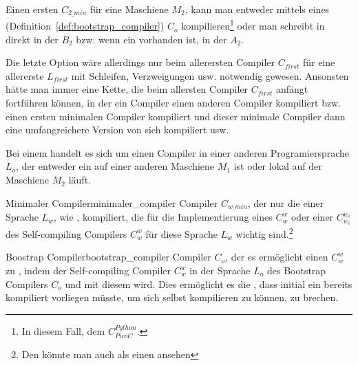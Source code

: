 \begin{Special_Paragraph}
  Einen ersten  $C_{2\_min}$ für eine Maschiene $M_2$, kann man entweder mittels eines   (Definition~\ref{def:bootstrap_compiler}) $C_o$ kompilieren\footnote{In diesem Fall, dem  $C_{PicoC}^{Python}$.} oder man schreibt in direkt in der  $B_2$ bzw. wenn ein  vorhanden ist, in der  $A_2$.

  Die letzte Option wäre allerdings nur beim allerersten Compiler $C_{first}$ für eine allererste  $L_{first}$ mit Schleifen, Verzweigungen usw. notwendig gewesen. Ansonsten hätte man immer eine Kette, die beim allersten Compiler $C_{first}$ anfängt fortführen können, in der ein Compiler einen anderen Compiler kompiliert bzw. einen ersten minimalen Compiler kompiliert und dieser minimale Compiler dann eine umfangreichere Version von sich kompiliert usw.

  Bei einem  handelt es sich um einen Compiler in einer anderen Programiersprache $L_o$, der entweder ein  auf einer anderen Maschiene $M_1$ ist oder lokal auf der Maschiene $M_2$ läuft.
\end{Special_Paragraph}

\begin{Definition}{Minimaler Compiler}{minimaler_compiler}
  Compiler $C_{w\_min}$, der nur die  einer Sprache $L_w$, wie ,   kompiliert, die für die Implementierung eines  $C_{w}^{w}$ oder einer  $C_{w_i}^{w_i}$ des Self-compiling Compilers $C_w^w$ für diese Sprache $L_w$ wichtig sind.\footnote{Den  könnte man auch als einen  ansehen}
\end{Definition}{}{}

\begin{Definition}{Boostrap Compiler}{bootstrap_compiler}
  Compiler $C_o$, der es ermöglicht einen  $C_w^w$ zu , indem der Self-compiling Compiler $C_w^w$ in der Sprache $L_o$ des Bootstrap Compilers $C_o$  und mit diesem  wird. Dies ermöglicht es die , dass initial ein  bereits kompiliert vorliegen müsste, um sich selbst kompilieren zu können, zu brechen.

  \setcounter{defcounter}{\value{\tcbcounter}}
\end{Definition}

